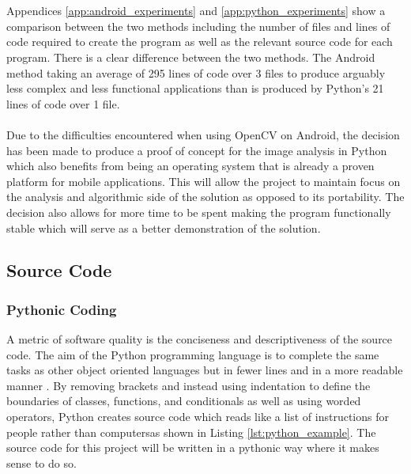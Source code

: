 		\\\\
		Appendices \ref{app:android_experiments} and \ref{app:python_experiments} show a comparison between the two methods including the number of files and lines of code required to create the program as well as the relevant source code for each program. There is a clear difference between the two methods. The Android method taking an average of 295 lines of code over 3 files to produce arguably less complex and less functional applications than is produced by Python’s 21 lines of code over 1 file.
		\\\\
		Due to the difficulties encountered when using OpenCV on Android, the decision has been made to produce a proof of concept for the image analysis in Python which also benefits from being an operating system that is already a proven platform for mobile applications. This will allow the project to maintain focus on the analysis and algorithmic side of the solution as opposed to its portability. The decision also allows for more time to be spent making the program functionally stable which will serve as a better demonstration of the solution.
	\subsection{Source Code}
		\subsubsection{Pythonic Coding}
			A metric of software quality is the conciseness and descriptiveness of the source code. The aim of the Python programming language is to complete the same tasks as other object oriented languages but in fewer lines and in a more readable manner \citep{kuhlman2009python}. By removing brackets and instead using indentation to define the boundaries of classes, functions, and conditionals as well as using worded operators, Python creates source code which reads like a list of instructions for people rather than computersas shown in Listing \ref{lst:python_example}. The source code for this project will be written in a pythonic way where it makes sense to do so.
